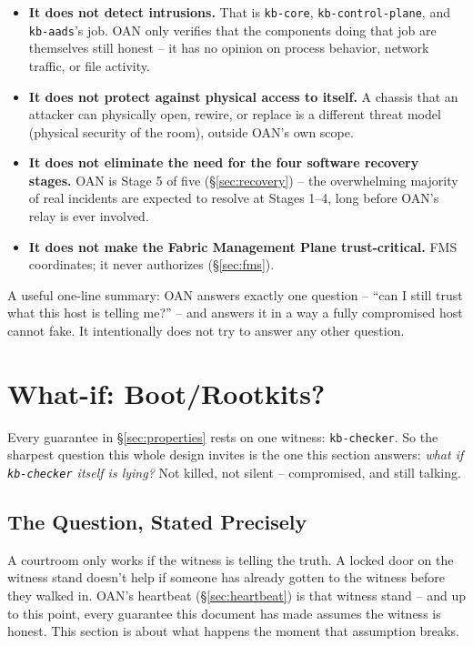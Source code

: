 \documentclass[11pt,a4paper]{article}
\begin{document}
\begin{itemize}
  \item \textbf{It does not detect intrusions.} That is
    \texttt{kb-core}, \texttt{kb-control-plane}, and \texttt{kb-aads}'s
    job. OAN only verifies that the components doing that job are
    themselves still honest -- it has no opinion on process behavior,
    network traffic, or file activity.
  \item \textbf{It does not protect against physical access to itself.}
    A chassis that an attacker can physically open, rewire, or replace
    is a different threat model (physical security of the room),
    outside OAN's own scope.
  \item \textbf{It does not eliminate the need for the four software
    recovery stages.} OAN is Stage 5 of five (\S\ref{sec:recovery}) --
    the overwhelming majority of real incidents are expected to resolve
    at Stages 1--4, long before OAN's relay is ever involved.
  \item \textbf{It does not make the Fabric Management Plane
    trust-critical.} FMS coordinates; it never authorizes
    (\S\ref{sec:fms}).
\end{itemize}

\begin{plainbox}
A useful one-line summary: OAN answers exactly one question --
``can I still trust what this host is telling me?'' -- and answers it
in a way a fully compromised host cannot fake. It intentionally does
not try to answer any other question.
\end{plainbox}

\section{What-if: Boot/Rootkits?}
\label{sec:whatif}

Every guarantee in \S\ref{sec:properties} rests on one witness:
\texttt{kb-checker}. So the sharpest question this whole design
invites is the one this section answers: \emph{what if
\texttt{kb-checker} itself is lying?} Not killed, not silent --
compromised, and still talking.

\subsection{The Question, Stated Precisely}

\begin{analogybox}
A courtroom only works if the witness is telling the truth. A locked
door on the witness stand doesn't help if someone has already gotten
to the witness before they walked in. OAN's heartbeat
(\S\ref{sec:heartbeat}) is that witness stand -- and up to this point,
every guarantee this document has made assumes the witness is honest.
This section is about what happens the moment that assumption breaks.
\end{analogybox}
\end{document}
